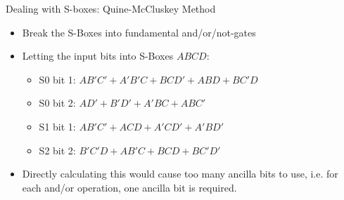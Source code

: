 \documentclass{beamer}
\begin{document}
    \begin{frame}{Dealing with S-boxes: Quine-McCluskey Method}
        \begin{itemize}
            \item Break the S-Boxes into fundamental and/or/not-gates
            \item Letting the input bits into S-Boxes $ABCD$:
            \begin{itemize}
                \item S0 bit 1: $AB'C'+A'B'C+BCD'+ABD+BC'D$
                \item S0 bit 2: $AD'+B'D'+A'BC+ABC'$
                \item S1 bit 1: $AB'C'+ACD+A'CD'+A'BD'$
                \item S2 bit 2: $B'C'D+AB'C+BCD+BC'D'$
            \end{itemize}
            \item Directly calculating this would cause too many ancilla bits to use, i.e. for each and/or operation, one ancilla bit is required.
        \end{itemize}
    \end{frame}
\end{document}
